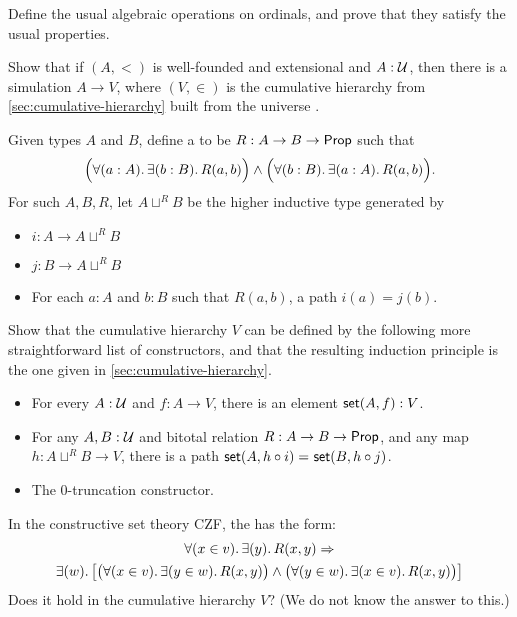 \begin{ex}
  Define the usual algebraic operations on ordinals, and prove that they satisfy the usual properties.
\end{ex}

\begin{ex}
  Show that if $(A,<)$ is well-founded and extensional and $A:\mathcal{U}$, then there is a simulation $A\to V$, where $(V,\in)$ is the cumulative hierarchy from \autoref{sec:cumulative-hierarchy} built from the universe \UU.
\end{ex}

\begin{ex}\label{ex:cumhierhit}
  Given types $A$ and $B$, define a  to be $R:A\to B\to \mathsf{Prop}$ such that
  \[ \Big(\fall{a:A}\exis{b:B} R(a,b) \Big) \land \Big(\fall{b:B}\exis{a:A} R(a,b) \Big). \]
  For such $A,B,R$, let $A\sqcup^R B$ be the higher inductive type generated by
  \begin{itemize}
  \item $i:A\to A\sqcup^R B$
  \item $j:B\to A\sqcup^R B$
  \item For each $a:A$ and $b:B$ such that $R(a,b)$, a path $i(a)=j(b)$.
  \end{itemize}
  Show that the cumulative hierarchy $V$ can be defined by the following more straightforward list of constructors, and that the resulting induction principle is the one given in \autoref{sec:cumulative-hierarchy}.
  \begin{itemize}
  \item For every $A : \mathcal{U}$ and $f : A \to V$, there is an element $\mathsf{set}(A, f) : V$.
  \item For any $A,B:\mathcal{U}$ and bitotal relation $R:A\to B\to \mathsf{Prop}$, and any map $h:A\sqcup^R B \to V$, there is a path $\mathsf{set}(A,h\circ i) =_{} \mathsf{set}(B,h\circ j)$.
  \item The 0-truncation constructor.
  \end{itemize}
\end{ex}

\begin{ex}
   In the constructive set theory CZF, the  has the form:
   \begin{multline*}
   \fall{x\in v}\exis{y} R(x,y) \Rightarrow \\
   \exis{w}\big[\big(\fall{x\in v}\exis{y\in w}R(x,y)\big)\land \big(\fall{y\in w}\exis{x\in v}R(x,y) \big)\big]
   \end{multline*}
   Does it hold in the cumulative hierarchy $V$?  (We do not know the answer to this.)
\end{ex}

